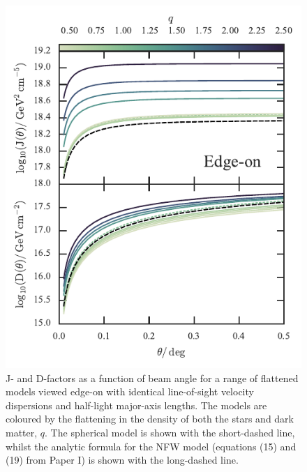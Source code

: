 \documentclass[prd,twocolumn,showpacs,preprintnumbers,superscriptaddress,nofootinbib,amsmath,amssymb,nobalancelastpage]{revtex4}
\begin{document}
\begin{figure}
\includegraphics[width=\columnwidth]{J_profiles_sim_edge}
\caption{J- and D-factors as a function of beam angle for a range of
  flattened models viewed edge-on with identical line-of-sight
  velocity dispersions and half-light major-axis lengths. The models are
  coloured by the flattening in the density of both the stars and dark matter,
  $q$. The spherical model is shown with the short-dashed line, whilst
  the analytic formula for the NFW model (equations (15) and (19) from
  Paper I) is shown with the long-dashed line.}
\label{fig:sim_profiles_edge}
\end{figure}
%
\end{document}
